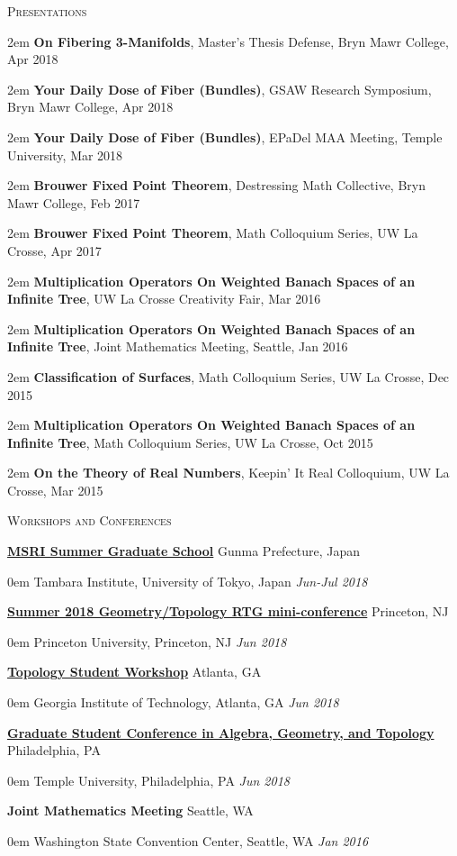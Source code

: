 \documentclass[11pt]{article}
\newenvironment{headitem}[2]{\hspace{.5em} \textbf{#1} \hfill #2 \begin{addmargin}[0em]{0em}}{\end{addmargin}}
\renewenvironment{section}[1]{\textsc{\large #1} \vskip5pt}{\vskip10pt}
\newcommand{\itemreg}[1]{\begin{addmargin}[.75em]{2em} #1 \end{addmargin}}
\newcommand{\itemdate}[2]{\hspace{.5em} #1 \hfill \textit{#2} \\}
\begin{document}
\begin{section}{Presentations}
	\itemreg{\textbf{On Fibering 3-Manifolds}, Master's Thesis Defense, Bryn Mawr College, Apr 2018} \vskip2pt
	\itemreg{\textbf{Your Daily Dose of Fiber (Bundles)}, GSAW Research Symposium, Bryn Mawr College, Apr 2018} \vskip2pt
	\itemreg{\textbf{Your Daily Dose of Fiber (Bundles)}, EPaDel MAA Meeting, Temple University, Mar 2018} \vskip2pt
	\itemreg{\textbf{Brouwer Fixed Point Theorem}, Destressing Math Collective, Bryn Mawr College, Feb 2017} \vskip2pt
	\itemreg{\textbf{Brouwer Fixed Point Theorem}, Math Colloquium Series, UW La Crosse, Apr 2017} \vskip2pt
	\itemreg{\textbf{Multiplication Operators On Weighted Banach Spaces of an Infinite Tree}, UW La Crosse Creativity Fair, Mar 2016} \vskip2pt
	\itemreg{\textbf{Multiplication Operators On Weighted Banach Spaces of an Infinite Tree}, Joint Mathematics Meeting, Seattle, Jan 2016} \vskip2pt
	\itemreg{\textbf{Classification of Surfaces}, Math Colloquium Series, UW La Crosse, Dec 2015} \vskip2pt
	\itemreg{\textbf{Multiplication Operators On Weighted Banach Spaces of an Infinite Tree}, Math Colloquium Series, UW La Crosse, Oct 2015} \vskip2pt
	\itemreg{\textbf{On the Theory of Real Numbers}, Keepin' It Real Colloquium, UW La Crosse, Mar 2015} 
\end{section}



\begin{section}{Workshops and Conferences}

	\begin{headitem}{\href{http://www.msri.org/web/msri/scientific/workshops/summer-graduate-school}{MSRI Summer Graduate School}}{Gunma Prefecture, Japan}
		\itemdate{Tambara Institute, University of Tokyo, Japan}{Jun-Jul 2018}
	\end{headitem}
	\vskip5pt
	
	\begin{headitem}{\href{https://web.math.princeton.edu/~petero/RTG/MiniConf1.html}{Summer 2018 Geometry/Topology RTG mini-conference}}{Princeton, NJ}
		\itemdate{Princeton University, Princeton, NJ}{Jun 2018}
	\end{headitem}
	\vskip5pt	
	
	\begin{headitem}{\href{http://people.math.gatech.edu/~dmargalit7/tsw18/index.shtml}{Topology Student Workshop}}{Atlanta, GA}
		\itemdate{Georgia Institute of Technology, Atlanta, GA}{Jun 2018}
	\end{headitem}
	\vskip5pt
	
	\begin{headitem}{\href{https://math.temple.edu/events/conferences/gscagt/}{Graduate Student Conference in Algebra, Geometry, and Topology}}{Philadelphia, PA}
		\itemdate{Temple University, Philadelphia, PA}{Jun 2018}
	\end{headitem}
	\vskip5pt

	\begin{headitem}{Joint Mathematics Meeting}{Seattle, WA}
		\itemdate{Washington State Convention Center, Seattle, WA}{Jan 2016}
	\end{headitem}

\end{section}
\end{document}
